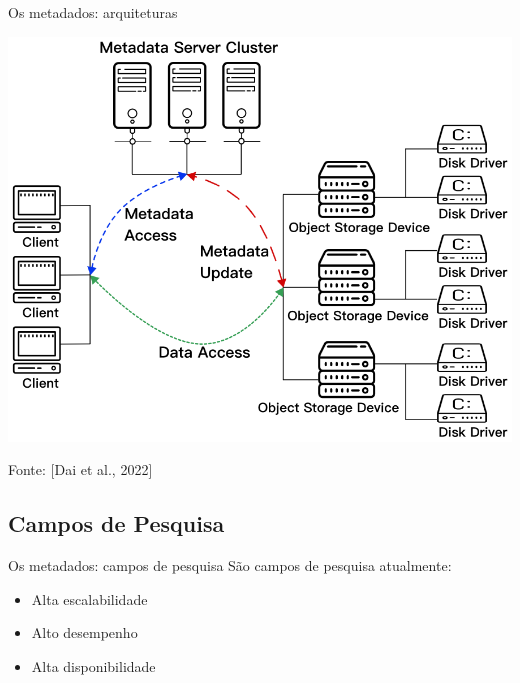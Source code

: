 \documentclass[xcolor=dvipsnames,table]{beamer}
\begin{document}
\begin{frame}{Os metadados: arquiteturas}
	\begin{center}
		\includegraphics[scale=0.25]{metadados2.png}
	\end{center}
	Fonte: [Dai et al., 2022]
\end{frame}

\subsection{Campos de Pesquisa}
\begin{frame}{Os metadados: campos de pesquisa}
	São campos de pesquisa atualmente:
	\begin{itemize}
		\item Alta escalabilidade
		\item Alto desempenho
		\item Alta disponibilidade
	\end{itemize}
\end{frame}
\end{document}
